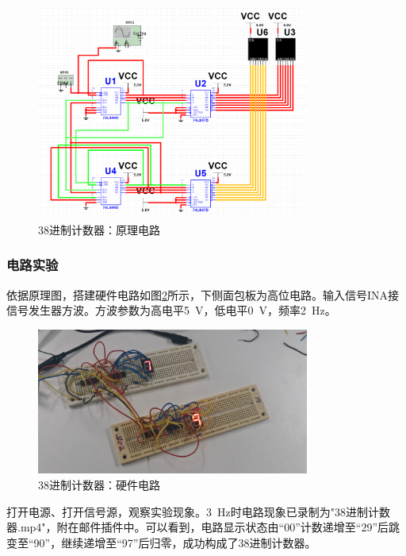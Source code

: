 \documentclass[UTF8]{ctexart}
\numberwithin{figure}{subsection}
\numberwithin{table}{subsection}
\numberwithin{equation}{subsection}
\begin{document}
\begin{figure}[H]
    \begin{center}
        \includegraphics[width=0.8\textwidth]{design/38 circuit.png}
    \end{center}
    \caption{38进制计数器：原理电路}
    \label{38 theory cir}
\end{figure}


\subsubsection{电路实验}
\par 依据原理图，搭建硬件电路如图\ref{38 cir}所示，下侧面包板为高位电路。输入信号INA接信号发生器方波。方波参数为高电平\SI{5}{\volt}，低电平\SI{0}{\volt}，频率\SI{2}{\hertz}。

\begin{figure}[H]
    \begin{center}
        \includegraphics[width=0.8\textwidth]{38.png}
    \end{center}
    \caption{38进制计数器：硬件电路}
    \label{38 cir}
\end{figure}

\par 打开电源、打开信号源，观察实验现象。\SI{3}{\hertz}时电路现象已录制为"38进制计数器.mp4"，附在邮件插件中。可以看到，电路显示状态由“00”计数递增至“29”后跳变至“90”，继续递增至“97”后归零，成功构成了38进制计数器。
\end{document}
